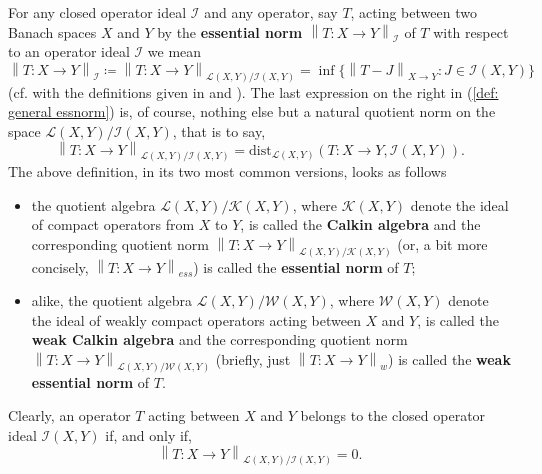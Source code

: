 \documentclass[11pt]{amsart}
\theoremstyle{definition}
\theoremstyle{definition}
\theoremstyle{definition}
\theoremstyle{definition}
\theoremstyle{definition}
\theoremstyle{definition}
\theoremstyle{definition}
\theoremstyle{definition}
\numberwithin{equation}{section}
\numberwithin{equation}{section}
\numberwithin{equation}{section}
\theoremstyle{definition}
\theoremstyle{definition}
\theoremstyle{definition}
\theoremstyle{definition}
\theoremstyle{definition}
\theoremstyle{definition}
\newcommand{\norm}[1]{\left\lVert#1\right\rVert}
\begin{document}
For any closed operator ideal $\mathscr{I}$ and any operator, say $T$, acting between two Banach spaces $X$ and $Y$ by the {\bf essential
norm $\norm{ T \colon X \rightarrow Y }_{\mathscr{I}}$} of $T$ with respect to an operator ideal $\mathscr{I}$ we mean
\begin{equation}\label{def: general essnorm}
	\norm{T \colon X \rightarrow Y}_{\mathscr{I}} \coloneqq \norm{T \colon X \rightarrow Y}_{{\mathscr L}(X,Y)/\mathscr{I}(X,Y)}
		= \inf\{\norm{T - J}_{X \rightarrow Y} \colon J \in \mathscr{I}(X,Y)\}
\end{equation}
(cf. with the definitions given in \cite[p.~96]{Tyl95} and \cite[Definition~0.3]{Lef09}). The last expression on the right in (\ref{def: general essnorm})
is, of course, nothing else but a natural quotient norm on the space ${\mathscr L}(X,Y)/\mathscr{I}(X,Y)$, that is to say,
\begin{equation*}
	\norm{T \colon X \rightarrow Y}_{{\mathscr L}(X,Y)/\mathscr{I}(X,Y)} = \text{dist}_{\mathscr{L}(X,Y)}(T \colon X \rightarrow Y,\mathscr{I}(X,Y)).
\end{equation*}
The above definition, in its two most common versions, looks as follows
\begin{itemize}
	\item[$\bullet$] the quotient algebra ${\mathscr L}(X,Y)/{\mathscr K}(X,Y)$, where ${\mathscr K}(X,Y)$ denote the ideal of compact operators from $X$ to $Y$,
		is called the {\bf Calkin algebra} and the corresponding quotient norm $\norm{T \colon X \rightarrow Y}_{{\mathscr L}(X,Y)/\mathscr{K}(X,Y)}$
		(or, a bit more concisely, $\norm{T \colon X \rightarrow Y}_{ess}$) is called the {\bf essential norm} of $T$;
	\item[$\bullet$] alike, the quotient algebra ${\mathscr L}(X,Y)/{\mathscr W}(X,Y)$, where ${\mathscr W}(X,Y)$ denote the ideal of weakly compact operators
		acting between $X$ and $Y$, is called the {\bf weak Calkin algebra} and the corresponding quotient norm $\norm{T \colon X \rightarrow Y}_{{\mathscr L}(X,Y)/\mathscr{W}(X,Y)}$
		(briefly, just $\norm{T \colon X \rightarrow Y}_w$) is called the {\bf weak essential norm} of $T$.
\end{itemize}
Clearly, an operator $T$ acting between $X$ and $Y$ belongs to the closed operator ideal $\mathscr{I}(X,Y)$ if, and only if,
\begin{equation*}
	\norm{T \colon X \rightarrow Y}_{{\mathscr L}(X,Y)/\mathscr{I}(X,Y)} = 0.
\end{equation*}
\end{document}
